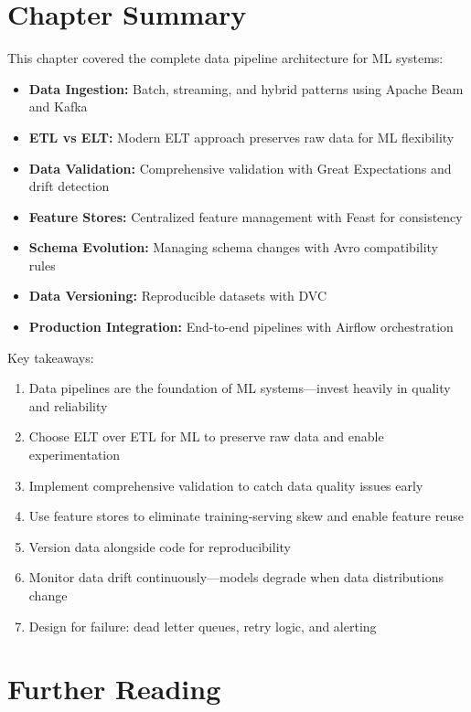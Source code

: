 \section{Chapter Summary}

This chapter covered the complete data pipeline architecture for ML systems:

\begin{itemize}
    \item \textbf{Data Ingestion:} Batch, streaming, and hybrid patterns using Apache Beam and Kafka
    \item \textbf{ETL vs ELT:} Modern ELT approach preserves raw data for ML flexibility
    \item \textbf{Data Validation:} Comprehensive validation with Great Expectations and drift detection
    \item \textbf{Feature Stores:} Centralized feature management with Feast for consistency
    \item \textbf{Schema Evolution:} Managing schema changes with Avro compatibility rules
    \item \textbf{Data Versioning:} Reproducible datasets with DVC
    \item \textbf{Production Integration:} End-to-end pipelines with Airflow orchestration
\end{itemize}

Key takeaways:

\begin{enumerate}
    \item Data pipelines are the foundation of ML systems—invest heavily in quality and reliability
    \item Choose ELT over ETL for ML to preserve raw data and enable experimentation
    \item Implement comprehensive validation to catch data quality issues early
    \item Use feature stores to eliminate training-serving skew and enable feature reuse
    \item Version data alongside code for reproducibility
    \item Monitor data drift continuously—models degrade when data distributions change
    \item Design for failure: dead letter queues, retry logic, and alerting
\end{enumerate}

\section{Further Reading}

